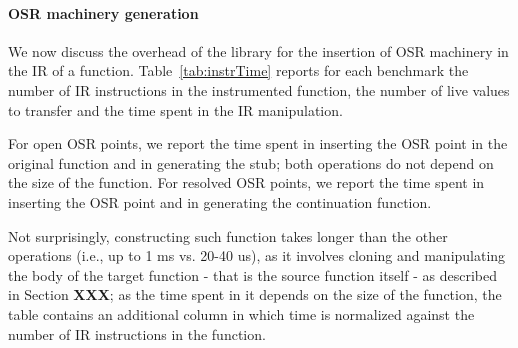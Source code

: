 \paragraph{OSR machinery generation}
We now discuss the overhead of the library for the insertion of OSR machinery in the IR of a function. Table~\ref{tab:instrTime} reports for each benchmark the number of IR instructions in the instrumented function, the number of live values to transfer and the time spent in the IR manipulation. 

For open OSR points, we report the time spent in inserting the OSR point in the original function and in generating the stub; both operations do not depend on the size of the function. For resolved OSR points, we report the time spent in inserting the OSR point and in generating the continuation function.

Not surprisingly, constructing such function takes longer than the other operations (i.e., up to 1 ms vs. 20-40 us), as it involves cloning and manipulating the body of the target function - that is the source function itself - as described in Section {\bf XXX}; as the time spent in it depends on the size of the function, the table contains an additional column in which time is normalized against the number of IR instructions in the function.

